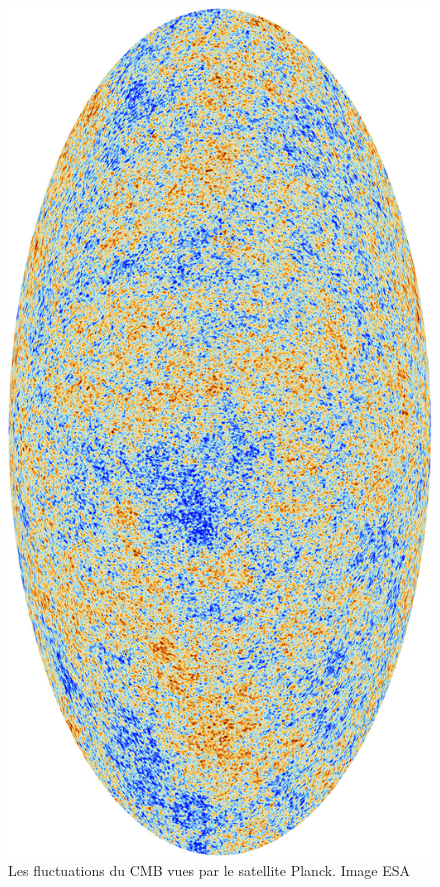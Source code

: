 \begin{figure}[htbp]
        \includegraphics[height=.95\textheight]{img/01/CMB.jpeg} 
        \caption[CMB]{Les fluctuations du \ac{CMB} vues par le satellite Planck. 
        Image ESA}
 		\label{fig:cmb}
\end{figure}

